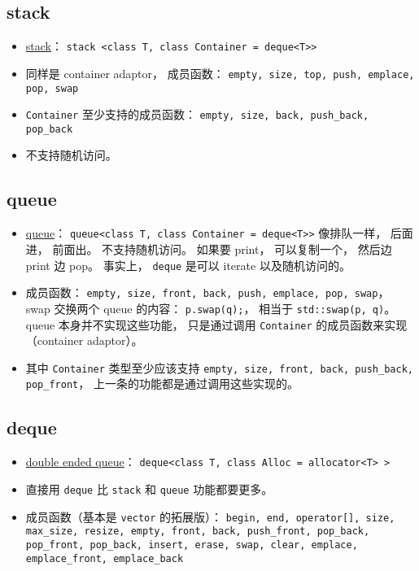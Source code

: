 \subsection{stack}
\begin{itemize}
\item \href{https://cplusplus.com/reference/stack/stack/}{stack}： \verb|stack <class T, class Container = deque<T>>|
\item 同样是 container adaptor， 成员函数： \verb|empty, size, top, push, emplace, pop, swap|
\item \verb|Container| 至少支持的成员函数： \verb|empty, size, back, push_back, pop_back|
\item 不支持随机访问。
\end{itemize}

\subsection{queue}
\begin{itemize}
\item \href{https://cplusplus.com/reference/queue/queue/}{queue}： \verb|queue<class T, class Container = deque<T>>| 像排队一样， 后面进， 前面出。 不支持随机访问。 如果要 print， 可以复制一个， 然后边 print 边 pop。 事实上， \verb|deque| 是可以 iterate 以及随机访问的。
\item 成员函数： \verb|empty, size, front, back, push, emplace, pop, swap|， swap 交换两个 queue 的内容： \verb|p.swap(q);|， 相当于 \verb|std::swap(p, q)|。 queue 本身并不实现这些功能， 只是通过调用 \verb|Container| 的成员函数来实现（container adaptor）。
\item 其中 \verb|Container| 类型至少应该支持 \verb|empty, size, front, back, push_back, pop_front|， 上一条的功能都是通过调用这些实现的。
\end{itemize}

\subsection{deque}
\begin{itemize}
\item \href{https://cplusplus.com/reference/deque/deque/}{double ended queue}： \verb|deque<class T, class Alloc = allocator<T> >|
\item 直接用 \verb|deque| 比 \verb|stack| 和 \verb|queue| 功能都要更多。
\item 成员函数（基本是 \verb|vector| 的拓展版）： \verb|begin, end, operator[], size, max_size, resize, empty, front, back, push_front, pop_back, pop_front, pop_back, insert, erase, swap, clear, emplace, emplace_front, emplace_back|
\end{itemize}

